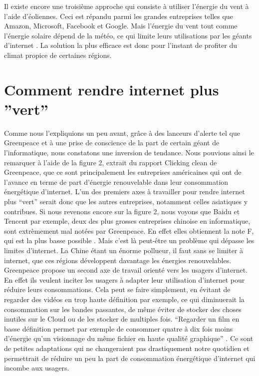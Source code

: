 \documentclass[a4paper,twocolumn,12pt]{article}
\begin{document}
	Il existe encore une troisième approche qui consiste à utiliser l'énergie du vent à l'aide d'éoliennes. Ceci est répandu parmi les grandes entreprises telles que Amazon, Microsoft, Facebook et Google. Mais l'énergie du vent tout comme l'énergie solaire dépend de la météo, ce qui limite leurs utilisations par les géants d'internet \cite{16}. La solution la plus efficace est donc pour l'instant de profiter du climat propice de certaines régions.

\section{Comment rendre internet plus ''vert''}

	Comme nous l’expliquions un peu avant, grâce à des lanceurs d’alerte tel que Greenpeace et à une prise de conscience de la part de certain géant de l’informatique, nous constatons une inversion de tendance. Nous pouvions ainsi le remarquer à l’aide de la figure 2, extrait du rapport Clicking clean de Greenpeace, que ce sont principalement les entreprises américaines qui ont de l’avance en terme de part d’énergie renouvelable dans leur consommation énergétique d’internet. L’un des premiers axes à travailler pour rendre internet plus “vert” serait donc que les autres entreprises, notamment celles asiatiques y contribues. Si nous revenons encore sur la figure 2, nous voyons que Baidu et Tencent par exemple, deux des plus grosses entreprises chinoise en informatique, sont extrèmement mal notées par Greenpeace. En effet elles obtiennent la note F, qui est la plus basse possible \cite{3}. Mais c’est là peut-être un problème qui dépasse les limites d’internet. La Chine étant un énorme pollueur, il faut sans se limiter à internet, que ces régions développent davantage les énergies renouvelables. \\

	Greenpeace propose un second axe de travail orienté vers les usagers d’internet. En effet ils veulent inciter les usagers à adapter leur utilisation d’internet pour réduire leurs consommations. Cela peut se faire simplement, en évitant de regarder des vidéos en trop haute définition par exemple, ce qui diminuerait la consommation sur les bandes passantes, de même éviter de stocker des choses inutiles sur le Cloud ou de les stocker de multiples fois. “Regarder un film en basse définition permet par exemple de consommer quatre à dix fois moins d’énergie qu’un visionnage du même fichier en haute qualité graphique” \cite{3}. Ce sont de petites adaptations qui ne changeraient pas drastiquement notre quotidien et permettrait de réduire un peu la part de consommation énergétique d’internet qui incombe aux usagers. \\
	
\end{document}
